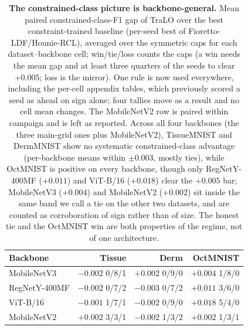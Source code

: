 \begin{table}[t]\centering\small
\setlength{\tabcolsep}{4.5pt}
\caption{\textbf{The constrained-class picture is backbone-general.} Mean paired
constrained-class-F1 gap of TraLO over the best constraint-trained baseline (per-seed best of
Fioretto-LDF/Hounie-RCL), averaged over the symmetric caps for each dataset--backbone cell;
{\scriptsize win/tie/loss} counts the caps (a win needs the mean gap and {at least three quarters} of the seeds
to clear $+0.005$; loss is the mirror).{ One rule is now used everywhere, including the per-cell appendix tables, which previously scored a seed as ahead on sign alone; four tallies move as a result and no cell mean changes. The MobileNetV2 row is paired within campaign and is left as reported.} Across all four backbones (the three main-grid ones
plus MobileNetV2), TissueMNIST and DermMNIST show no systematic constrained-class advantage
(per-backbone means within $\pm0.003$, mostly ties), while OctMNIST is
{positive on every backbone, though only RegNetY-400MF ($+0.011$) and
ViT-B/16 ($+0.018$) clear the $+0.005$ bar; MobileNetV3 ($+0.004$) and MobileNetV2
($+0.002$) sit inside the same band we call a tie on the other two datasets, and are
counted as corroboration of sign rather than of size}.
The honest tie and the OctMNIST win are both properties of the regime, not of one architecture.}
\label{tab:bbgen}
\begin{tabular}{l rrr}
\toprule
Backbone & Tissue & Derm & OctMNIST \\
\midrule
MobileNetV3    & $-0.002$ {\scriptsize {0/8/1}} & $+0.002$ {\scriptsize 0/9/0} & $+0.004$ {\scriptsize {1/8/0}} \\
RegNetY-400MF  & $-0.002$ {\scriptsize {0/7/2}} & $-0.003$ {\scriptsize 0/7/2} & $+0.011$ {\scriptsize {3/6/0}} \\
ViT-B/16       & $-0.001$ {\scriptsize 1/7/1} & $-0.002$ {\scriptsize {0/9/0}} & $+0.018$ {\scriptsize 5/4/0} \\
MobileNetV2    & $+0.002$ {\scriptsize 3/3/1} & $-0.002$ {\scriptsize 1/3/2} & $+0.002$ {\scriptsize 1/3/1} \\
\bottomrule
\end{tabular}
\end{table}
